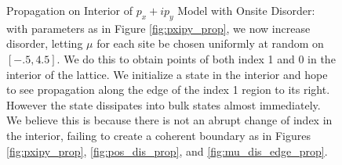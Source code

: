 \documentclass[a4paper]{article}
\begin{document}
\begin{figure}
\centering
{}%
%

%
%
\caption{Propagation on Interior of $p_x + ip_y$ Model with Onsite Disorder: with parameters as in Figure \ref{fig:pxipy_prop}, we now increase disorder, letting $\mu$ for each site be chosen uniformly at random on $[-.5,4.5]$.
We do this to obtain points of both index 1 and 0 in the interior of the lattice.
We initialize a state in the interior and hope to see propagation along the edge of the index 1 region to its right.
However the state dissipates into bulk states almost immediately.
We believe this is because there is not an abrupt change of index in the interior, failing to create a coherent boundary as in Figures \ref{fig:pxipy_prop},  \ref{fig:pos_dis_prop}, and \ref{fig:mu_dis_edge_prop}.
}%
\label{fig:mu_dis_interior_prop}%
\end{figure}
\end{document}
